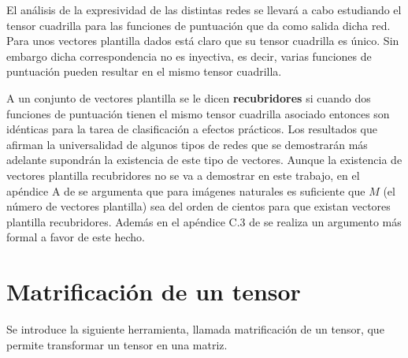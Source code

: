 El análisis de la expresividad de las distintas redes se llevará a cabo estudiando el tensor cuadrilla para las funciones de puntuación que da como salida dicha red. Para unos vectores plantilla dados está claro que su tensor cuadrilla es único. Sin embargo dicha correspondencia no es inyectiva, es decir, varias funciones de puntuación pueden resultar en el mismo tensor cuadrilla.

A un conjunto de vectores plantilla se le dicen \textbf{recubridores} si cuando dos funciones de puntuación tienen el mismo tensor cuadrilla asociado entonces son idénticas para la tarea de clasificación a efectos prácticos. Los resultados que afirman la universalidad de algunos tipos de redes que se demostrarán más adelante supondrán la existencia de este tipo de vectores. Aunque la existencia de vectores plantilla recubridores no se va a demostrar en este trabajo, en el apéndice A de \cite{DBLP:journals/corr/CohenS16} se argumenta que para imágenes naturales es suficiente que $M$ (el número de vectores plantilla) sea del orden de cientos para que existan vectores plantilla recubridores. Además en el apéndice C.3 de \cite{DBLP:journals/corr/CohenSS15a} se realiza un argumento más formal a favor de este hecho.


\section{Matrificación de un tensor}

Se introduce la siguiente herramienta, llamada matrificación de un tensor, que permite transformar un tensor en una matriz. 

